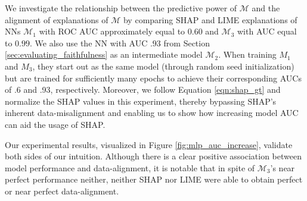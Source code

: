 \documentclass[mnsc,blindrev]{informs3}
\newcommand{\mM}{\mathcal{M}}
\begin{document}
            
            We investigate the relationship between the predictive power of $\mathcal{M}$ and the alignment of explanations of $\mM$ by comparing SHAP and LIME explanations of NNs $\mathcal{M}_1$  with ROC AUC approximately equal to $0.60$ and $\mathcal{M}_3$ with AUC equal to $0.99$. We also use the NN with AUC $.93$ from Section \ref{sec:evaluating_faithfulness} as an intermediate model $\mathcal{M}_2$. When training $M_1$ and $M_3$, they start out as the same model (through random seed initialization) but are trained for sufficiently many epochs to achieve their corresponding AUCs of .6 and .93, respectively. Moreover, we follow Equation \ref{eqn:shap_gt} and normalize the SHAP values in this experiment, thereby bypassing SHAP's inherent data-misalignment and enabling us to show how increasing model AUC can aid the usage of SHAP. 
            
            Our experimental results, visualized in Figure \ref{fig:mlp_auc_increase}, validate both sides of our intuition. Although there is a clear positive association between model performance and data-alignment, it is notable that in spite of $\mathcal{M}_3$'s near perfect performance neither, neither SHAP nor LIME were able to obtain perfect or near perfect data-alignment. %
     
\end{document}
